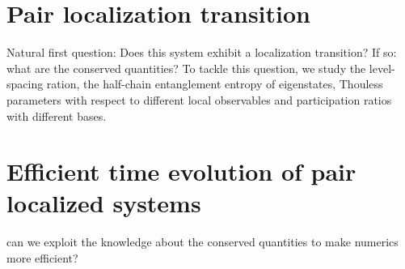 \chapter{Pair localization transition}

Natural first question: Does this system exhibit a localization transition? If so: what are the conserved quantities? To tackle this question, we study the level-spacing ration, the half-chain entanglement entropy of eigenstates, Thouless parameters with respect to different local observables and participation ratios with different bases.



\chapter{Efficient time evolution of pair localized systems}

can we exploit the knowledge about the conserved quantities to make numerics more efficient?

